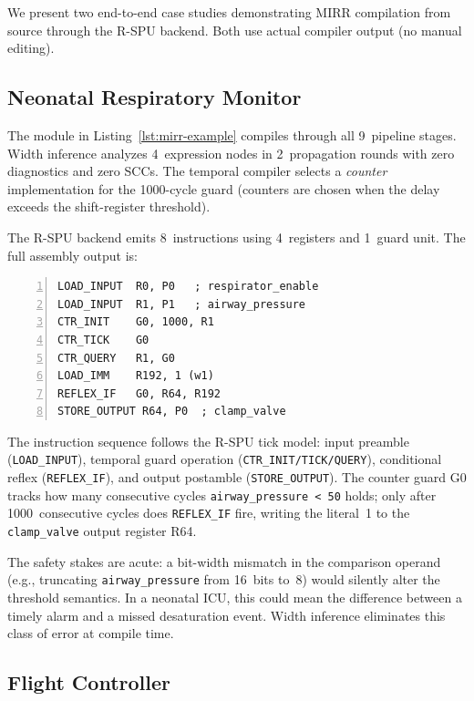 \documentclass[conference]{IEEEtran}
\begin{document}
We present two end-to-end case studies demonstrating MIRR compilation
from source through the R-SPU backend.  Both use actual compiler output
(no manual editing).

\subsection{Neonatal Respiratory Monitor}

The module in Listing~\ref{lst:mirr-example} compiles through
all 9~pipeline stages.  Width inference analyzes 4~expression nodes in
2~propagation rounds with zero diagnostics and zero SCCs.  The temporal
compiler selects a \emph{counter} implementation for the 1000-cycle guard
(counters are chosen when the delay exceeds the shift-register threshold).

The R-SPU backend emits 8~instructions using 4~registers and 1~guard
unit.  The full assembly output is:

\begin{lstlisting}[language=RSPU,numbers=left,
  caption={R-SPU assembly for the neonatal respiratory monitor.},
  label={lst:rspu-neonatal}]
LOAD_INPUT  R0, P0   ; respirator_enable
LOAD_INPUT  R1, P1   ; airway_pressure
CTR_INIT    G0, 1000, R1
CTR_TICK    G0
CTR_QUERY   R1, G0
LOAD_IMM    R192, 1 (w1)
REFLEX_IF   G0, R64, R192
STORE_OUTPUT R64, P0  ; clamp_valve
\end{lstlisting}

The instruction sequence follows the R-SPU tick model:
input preamble (\texttt{LOAD\_INPUT}),
temporal guard operation (\texttt{CTR\_INIT/TICK/QUERY}),
conditional reflex (\texttt{REFLEX\_IF}), and
output postamble (\texttt{STORE\_OUTPUT}).
The counter guard G0 tracks how many consecutive cycles
\texttt{airway\_pressure < 50} holds; only after 1000~consecutive cycles
does \texttt{REFLEX\_IF} fire, writing the literal~1 to the
\texttt{clamp\_valve} output register R64.

The safety stakes are acute: a bit-width mismatch in the comparison
operand (e.g., truncating \texttt{airway\_pressure} from 16~bits to~8)
would silently alter the threshold semantics.  In a neonatal ICU, this
could mean the difference between a timely alarm and a missed
desaturation event.  Width inference eliminates this class of error
at compile time.

\subsection{Flight Controller}
\end{document}
